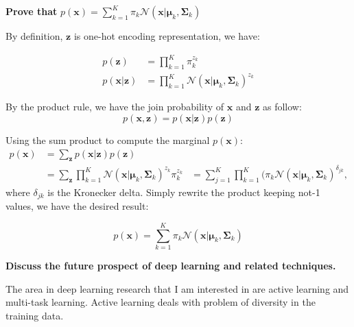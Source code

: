 \documentclass[12pt,twoside]{article}
\begin{document}
\begin{exercises}

\problem \textbf{Prove that} $p(\mathbf{x}) = \sum_{k=1}^{K} \pi_k \mathcal{N}(\mathbf{x}|\boldsymbol \mu_k,\boldsymbol \Sigma_k)$

\ifsolution \solution{}
By definition, $\mathbf{z}$ is one-hot encoding representation, we have:

\begin{equation*}
  \begin{aligned}
    p(\mathbf{z}) & = \prod^{K}_{k=1} \pi_k^{z_k} \\
    p(\mathbf{x}|\mathbf{z}) & = \prod^{K}_{k=1} \mathcal{N} (\mathbf{x}|\boldsymbol \mu_k, \boldsymbol \Sigma_k)^{z_k}
  \end{aligned}
\end{equation*}

By the product rule, we have the join probability of $\mathbf{x}$ and $\mathbf{z}$ as follow:
$$ p(\mathbf{x}, \mathbf{z}) = p(\mathbf{x}|\mathbf{z}) p(\mathbf{z}) $$

Using the sum product to compute the marginal $p(\mathbf{x})$:
\begin{equation*}
  \begin{aligned}
    p(\mathbf{x}) & = \sum_{\mathbf{z}} p(\mathbf{x}|\mathbf{z}) p(\mathbf{z})\\
                  & = \sum_{\mathbf{z}} \prod^{K}_{k=1} \mathcal{N} (\mathbf{x}|\boldsymbol \mu_k, \boldsymbol \Sigma_k)^{z_k} \pi_k^{z_k}
                  & = \sum_{j=1}^{K} \prod^{K}_{k=1} (\pi_k \mathcal{N}(\mathbf{x}|\boldsymbol \mu_k, \boldsymbol \Sigma_k)^{\delta_{jk}},
  \end{aligned}
\end{equation*}
where $\delta_{jk}$ is the Kronecker delta. Simply rewrite the product keeping not-1 values, we have the desired result:

$$ p(\mathbf{x}) = \sum_{k=1}^{K} \pi_k \mathcal{N}(\mathbf{x}|\boldsymbol \mu_k,\boldsymbol \Sigma_k) $$

\fi

\problem \textbf{Discuss the future prospect of deep learning and related techniques.}

\ifsolution \solution{}
The area in deep learning research that I am interested in are active learning
and multi-task learning. Active learning deals with problem of diversity in 
the training data. 

\fi


\end{exercises}
\end{document}
